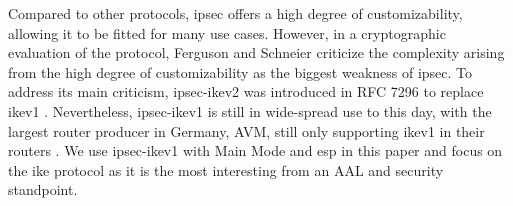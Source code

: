 Compared to other protocols, \ac{ipsec} offers a high degree of customizability, allowing it to be fitted for many use cases. However, in a cryptographic evaluation of the protocol, Ferguson and Schneier \textcite{ferguson1999cryptographic} criticize the complexity arising from the high degree of customizability as the biggest weakness of \ac{ipsec}. To address its main criticism, \ac{ipsec}-\ac{ike}v2 was introduced in RFC 7296 to replace \ac{ike}v1 \cite{kaufman2014internet}. Nevertheless, \ac{ipsec}-\ac{ike}v1 is still in wide-spread use to this day, with the largest router producer in Germany, AVM, still only supporting \ac{ike}v1 in their routers \cite{avm2022}. We use \ac{ipsec}-\ac{ike}v1 with Main Mode and \ac{esp} in this paper and focus on the \ac{ike} protocol as it is the most interesting from an AAL and security standpoint. %
